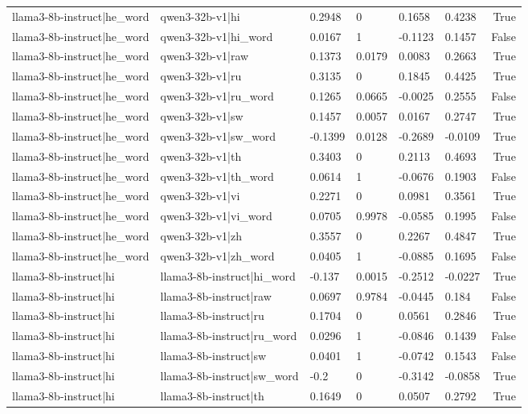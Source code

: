\begin{table}
\begin{tabular}{llllllr}
llama3-8b-instruct|he_word & qwen3-32b-v1|hi & 0.2948 & 0 & 0.1658 & 0.4238 & True \\
llama3-8b-instruct|he_word & qwen3-32b-v1|hi_word & 0.0167 & 1 & -0.1123 & 0.1457 & False \\
llama3-8b-instruct|he_word & qwen3-32b-v1|raw & 0.1373 & 0.0179 & 0.0083 & 0.2663 & True \\
llama3-8b-instruct|he_word & qwen3-32b-v1|ru & 0.3135 & 0 & 0.1845 & 0.4425 & True \\
llama3-8b-instruct|he_word & qwen3-32b-v1|ru_word & 0.1265 & 0.0665 & -0.0025 & 0.2555 & False \\
llama3-8b-instruct|he_word & qwen3-32b-v1|sw & 0.1457 & 0.0057 & 0.0167 & 0.2747 & True \\
llama3-8b-instruct|he_word & qwen3-32b-v1|sw_word & -0.1399 & 0.0128 & -0.2689 & -0.0109 & True \\
llama3-8b-instruct|he_word & qwen3-32b-v1|th & 0.3403 & 0 & 0.2113 & 0.4693 & True \\
llama3-8b-instruct|he_word & qwen3-32b-v1|th_word & 0.0614 & 1 & -0.0676 & 0.1903 & False \\
llama3-8b-instruct|he_word & qwen3-32b-v1|vi & 0.2271 & 0 & 0.0981 & 0.3561 & True \\
llama3-8b-instruct|he_word & qwen3-32b-v1|vi_word & 0.0705 & 0.9978 & -0.0585 & 0.1995 & False \\
llama3-8b-instruct|he_word & qwen3-32b-v1|zh & 0.3557 & 0 & 0.2267 & 0.4847 & True \\
llama3-8b-instruct|he_word & qwen3-32b-v1|zh_word & 0.0405 & 1 & -0.0885 & 0.1695 & False \\
llama3-8b-instruct|hi & llama3-8b-instruct|hi_word & -0.137 & 0.0015 & -0.2512 & -0.0227 & True \\
llama3-8b-instruct|hi & llama3-8b-instruct|raw & 0.0697 & 0.9784 & -0.0445 & 0.184 & False \\
llama3-8b-instruct|hi & llama3-8b-instruct|ru & 0.1704 & 0 & 0.0561 & 0.2846 & True \\
llama3-8b-instruct|hi & llama3-8b-instruct|ru_word & 0.0296 & 1 & -0.0846 & 0.1439 & False \\
llama3-8b-instruct|hi & llama3-8b-instruct|sw & 0.0401 & 1 & -0.0742 & 0.1543 & False \\
llama3-8b-instruct|hi & llama3-8b-instruct|sw_word & -0.2 & 0 & -0.3142 & -0.0858 & True \\
llama3-8b-instruct|hi & llama3-8b-instruct|th & 0.1649 & 0 & 0.0507 & 0.2792 & True \\

\end{tabular}
\end{table}

